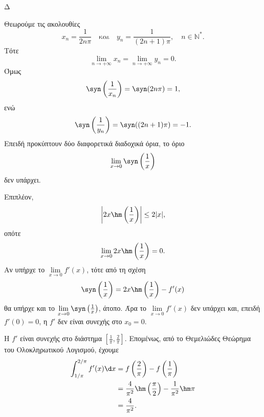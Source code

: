 \begin{thema}{Δ}
\begin{erwthma}
\item Θεωρούμε τις ακολουθίες
\[
x_n=\frac{1}{2n\pi}
\quad\text{και}\quad
y_n=\frac{1}{(2n+1)\pi},
\quad n\in\mathbb{N}^*.
\]
Τότε
\[
\lim_{n\to+\infty}x_n
=\lim_{n\to+\infty}y_n
=0.
\]
Όμως
\[
\syn\left(\frac{1}{x_n}\right)
=\syn(2n\pi)
=1,
\]
ενώ
\[
\syn\left(\frac{1}{y_n}\right)
=\syn((2n+1)\pi)
=-1.
\]
Επειδή προκύπτουν δύο διαφορετικά διαδοχικά όρια, το όριο
\[
{\lim_{x\to0}\syn\left(\frac{1}{x}\right)}
\]
δεν υπάρχει.

Επιπλέον,
\[
\left|2x\hm\left(\frac{1}{x}\right)\right|\leq2|x|,
\]
οπότε
\[
\lim_{x\to0}2x\hm\left(\frac{1}{x}\right)=0.
\]
Αν υπήρχε το $\lim\limits_{x\to0}f'(x)$, τότε από τη σχέση
\[
\syn\left(\frac{1}{x}\right)
=2x\hm\left(\frac{1}{x}\right)-f'(x)
\]
θα υπήρχε και το $\lim\limits_{x\to0}\syn\left(\frac{1}{x}\right)$, άτοπο. Άρα το $\lim\limits_{x\to0}f'(x)$ δεν υπάρχει και, επειδή $f'(0)=0$, η $f'$ δεν είναι συνεχής στο $x_0=0$.

\item Η $f'$ είναι συνεχής στο διάστημα $\left[\frac{1}{\pi},\frac{2}{\pi}\right]$. Επομένως, από το Θεμελιώδες Θεώρημα του Ολοκληρωτικού Λογισμού, έχουμε
\begin{align*}
\int_{1/\pi}^{2/\pi}f'(x)\d x
&=f\left(\frac{2}{\pi}\right)
-f\left(\frac{1}{\pi}\right)\\
&=\frac{4}{\pi^2}
\hm\left(\frac{\pi}{2}\right)
-\frac{1}{\pi^2}\hm\pi\\
&={\frac{4}{\pi^2}}.
\end{align*}
\end{erwthma}
\end{thema}

